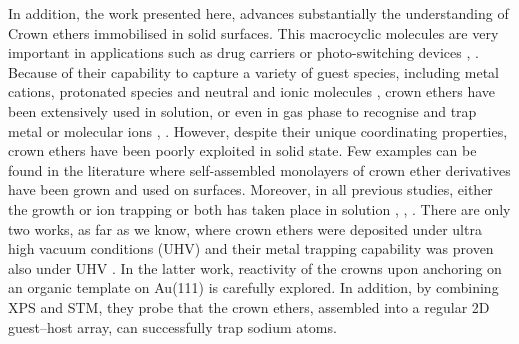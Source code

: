 \documentclass[aps,prl,reprint,longbibliography,superscriptaddress, english]{revtex4-1}
\begin{document}
In addition, the work presented here, advances substantially the understanding of Crown ethers immobilised in solid surfaces. 
This macrocyclic molecules are very important in applications such as drug carriers \cite{uchegbu_non-ionic_1998} or photo-switching devices \cite{malval_photoswitching_2002}, \cite{uda_membrane_2005}. Because of their capability to capture a variety of guest species, including metal cations, protonated species and neutral and ionic molecules \cite{dobler1980ionophores}, crown ethers \cite{gokel_crown_1991} have been extensively used in solution, or even in gas phase to recognise and trap metal or molecular ions \cite{more_intrinsic_1999}, \cite{maleknia_cavity-size-dependent_2002}. However, despite their unique coordinating properties, crown ethers have been poorly exploited in solid state. Few examples can be found in the literature where self-assembled monolayers of crown ether derivatives have been grown and used on surfaces. Moreover, in all previous studies, either the growth or ion trapping or both has taken place in solution \cite{yoshimoto_hostguest_2003}, \cite{flink_recognition_1999}, \cite{inokuchi_new_2015}. 
 There are only two works, as far as we know, where crown ethers were deposited under ultra high vacuum conditions (UHV) \cite{feng_growth_2018} and their metal trapping capability was proven also under UHV \cite{stredansky_-surface_2019}. In the latter work, reactivity of the crowns upon anchoring on an organic template on Au(111) is carefully explored. In addition, by combining XPS and STM, they probe that the crown ethers, assembled into a regular 2D guest--host array, can successfully trap sodium atoms.

\end{document}
